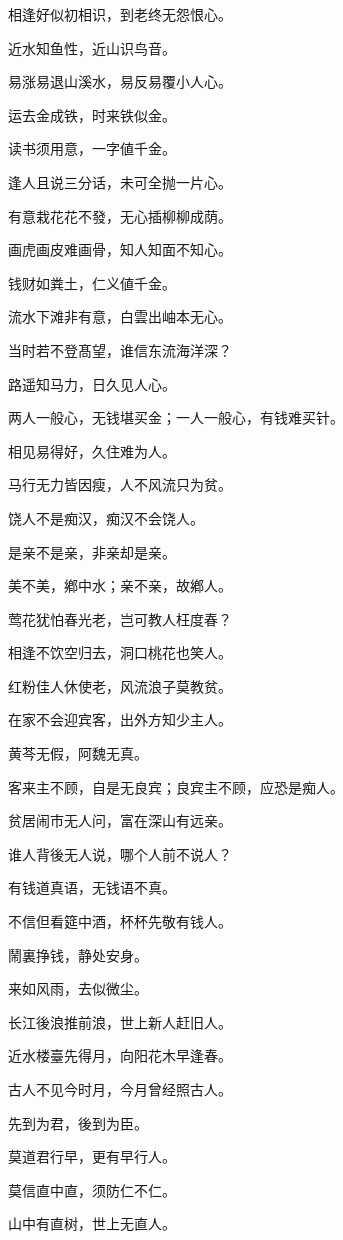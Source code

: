 \documentclass[12pt,oneside]{book}
\begin{document}
相逢好似初相识，到老终无怨恨心。

近水知鱼性，近山识鸟音。

易涨易退山溪水，易反易覆小人心。

运去金成铁，时来铁似金。

读书须用意，一字値千金。

逢人且说三分话，未可全抛一片心。

有意栽花花不發，无心插柳柳成荫。

画虎画皮难画骨，知人知面不知心。

钱财如粪土，仁义値千金。

流水下滩非有意，白雲出岫本无心。

当时若不登髙望，谁信东流海洋深？

路遥知马力，日久见人心。

两人一般心，无钱堪买金；一人一般心，有钱难买针。

相见易得好，久住难为人。

马行无力皆因瘦，人不风流只为贫。

饶人不是痴汉，痴汉不会饶人。

是亲不是亲，非亲却是亲。

美不美，鄕中水；亲不亲，故鄕人。

莺花犹怕春光老，岂可教人枉度春？

相逢不饮空归去，洞口桃花也笑人。

红粉佳人休使老，风流浪子莫教贫。

在家不会迎宾客，出外方知少主人。

黄芩无假，阿魏无真。

客来主不顾，自是无良宾；良宾主不顾，应恐是痴人。

贫居闹市无人问，富在深山有远亲。

谁人背後无人说，哪个人前不说人？

有钱道真语，无钱语不真。

不信但看筵中酒，杯杯先敬有钱人。

鬧裏挣钱，静处安身。

来如风雨，去似微尘。

长江後浪推前浪，世上新人赶旧人。

近水楼臺先得月，向阳花木早逢春。

古人不见今时月，今月曾经照古人。

先到为君，後到为臣。

莫道君行早，更有早行人。

莫信直中直，须防仁不仁。

山中有直树，世上无直人。
\end{document}
